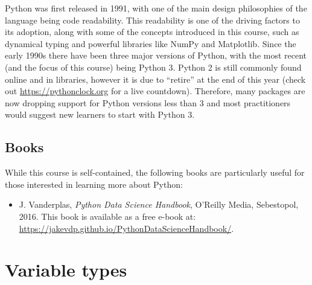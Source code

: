 \documentclass[a4paper]{article}
\begin{document}
Python was first released in 1991, with one of the main design philosophies of the language being code readability. 
This readability is one of the driving factors to its adoption, along with some of the concepts introduced in this course, such as dynamical typing and powerful libraries like NumPy and Matplotlib. 
Since the early 1990s there have been three major versions of Python, with the most recent (and the focus of this course) being Python 3. 
Python 2 is still commonly found online and in libraries, however it is due to ``retire'' at the end of this year (check out \url{https://pythonclock.org} for a live countdown). 
Therefore, many packages are now dropping support for Python versions less than 3 and most practitioners would suggest new learners to start with Python 3. 

\subsection{Books}

While this course is self-contained, the following books are particularly useful for those interested in learning more about Python: 
\begin{itemize}
	\item J. Vanderplas, \emph{Python Data Science Handbook}, O'Reilly Media, Sebestopol, 2016. This book is available as a free e-book at: \url{https://jakevdp.github.io/PythonDataScienceHandbook/}.
\end{itemize}

\section{Variable types}
\end{document}
